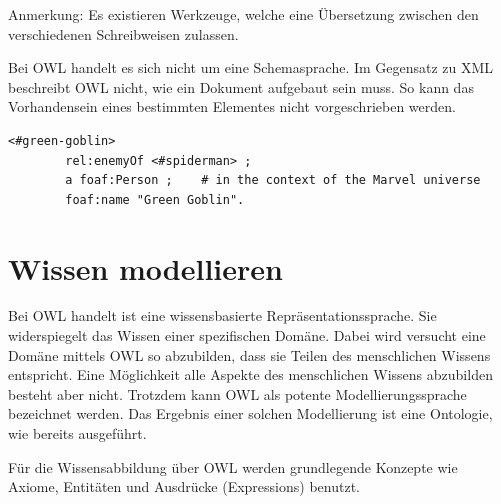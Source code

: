 Anmerkung: Es existieren Werkzeuge, welche eine Übersetzung zwischen den verschiedenen Schreibweisen zulassen.

Bei OWL handelt es sich nicht um eine Schemasprache. Im Gegensatz zu XML beschreibt OWL nicht, wie ein Dokument aufgebaut sein muss. So kann das Vorhandensein eines bestimmten Elementes nicht vorgeschrieben werden.

\begin{lstlisting}[caption={Beispiel der Turtle Syntax\protect\footnotemark}]
    <#green-goblin>
        rel:enemyOf <#spiderman> ;
        a foaf:Person ;    # in the context of the Marvel universe
        foaf:name "Green Goblin".
\end{lstlisting}

\section{Wissen modellieren}
\label{sec:owl_owl_wissenModellieren}
Bei OWL handelt ist eine wissensbasierte Repräsentationssprache. Sie widerspiegelt das Wissen einer spezifischen Domäne. Dabei wird versucht eine Domäne mittels OWL so abzubilden, dass sie Teilen des menschlichen Wissens entspricht. Eine Möglichkeit alle Aspekte des menschlichen Wissens abzubilden besteht aber nicht. Trotzdem kann OWL als potente Modellierungssprache bezeichnet werden. Das Ergebnis einer solchen Modellierung ist eine Ontologie, wie bereits ausgeführt.

Für die Wissensabbildung über OWL werden grundlegende Konzepte wie Axiome, Entitäten und Ausdrücke (Expressions) benutzt.


